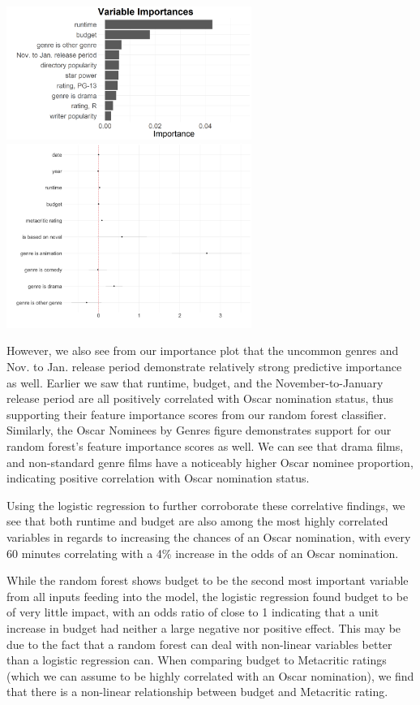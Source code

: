 \documentclass[10pt]{article}
\begin{document}
\begin{center}
\includegraphics[width=8cm]{_assets/predictive_analysis/variable_importance_rf_osc_nom.png}
\hspace{1cm}
\includegraphics[width=8cm]{_assets/log-reg-plots/dwplot.png}
\end{center}

However, we also see from our importance plot that the uncommon genres and Nov. to Jan. release period demonstrate relatively strong predictive importance as well. Earlier we saw that runtime, budget, and the November-to-January release period are all positively correlated with Oscar nomination status, thus supporting their feature importance scores from our random forest classifier. Similarly, the Oscar Nominees by Genres figure demonstrates support for our random forest’s feature importance scores as well. We can see that drama films, and non-standard genre films have a noticeably higher Oscar nominee proportion, indicating positive correlation with Oscar nomination status. 

Using the logistic regression to further corroborate these correlative findings, we see that both runtime and budget are also among the most highly correlated variables in regards to increasing the chances of an Oscar nomination, with every 60 minutes correlating with a 4\% increase in the odds of an Oscar nomination. 

While the random forest shows budget to be the second most important variable from all inputs feeding into the model, the logistic regression found budget to be of very little impact, with an odds ratio of close to 1 indicating that a unit increase in budget had neither a large negative nor positive effect. This may be due to the fact that a random forest can deal with non-linear variables better than a logistic regression can. When comparing budget to Metacritic ratings (which we can assume to be highly correlated with an Oscar nomination), we find that there is a non-linear relationship between budget and Metacritic rating. 
\end{document}
